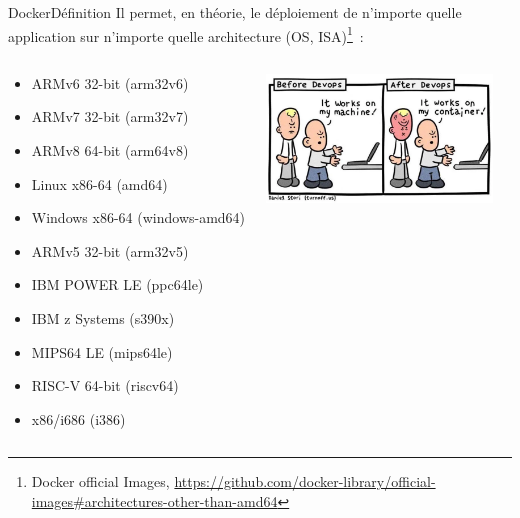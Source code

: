 \documentclass{beamer}
\begin{document}
    \begin{frame}{Docker}{Définition}
        Il permet, en théorie, le déploiement de n'importe quelle application sur n'importe quelle architecture (OS, ISA)\footnote{Docker official Images, \url{https://github.com/docker-library/official-images\#architectures-other-than-amd64}}~:
        \bigbreak
        \begin{columns}
            \begin{scriptsize}
                \begin{itemize}
                    \item ARMv6 32-bit (arm32v6)
                    \item ARMv7 32-bit (arm32v7)
                    \item ARMv8 64-bit (arm64v8)
                    \item Linux x86-64 (amd64)
                    \item Windows x86-64 (windows-amd64)
                    \item ARMv5 32-bit (arm32v5)
                    \item IBM POWER LE (ppc64le)
                    \item IBM z Systems (s390x)
                    \item MIPS64 LE (mips64le)
                    \item RISC-V 64-bit (riscv64)
                    \item x86/i686 (i386)
                \end{itemize}
            \end{scriptsize}
            \centering
            \includegraphics[width=6cm]{image/it-works}
        \end{columns}
    \end{frame}
\end{document}
